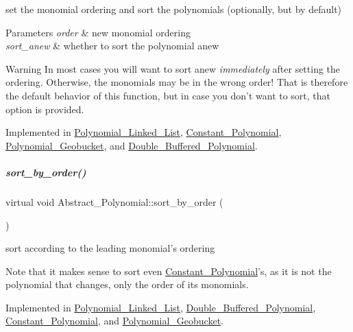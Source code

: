set the monomial ordering and sort the polynomials (optionally, but by default) 


\begin{DoxyParams}{Parameters}
{\em order} & new monomial ordering \\
\hline
{\em sort\+\_\+anew} & whether to sort the polynomial anew \\
\hline
\end{DoxyParams}
\begin{DoxyWarning}{Warning}
In most cases you will want to sort anew {\itshape immediately} after setting the ordering. Otherwise, the monomials may be in the wrong order! That is therefore the default behavior of this function, but in case you don't want to sort, that option is provided. 
\end{DoxyWarning}


Implemented in \hyperlink{group__polygroup_af9b1dee3a8ca9fb26a6e069ea70ea5df}{Polynomial\+\_\+\+Linked\+\_\+\+List}, \hyperlink{group__polygroup_a539835f92490fbbb5ba3b37e4f80ef49}{Constant\+\_\+\+Polynomial}, \hyperlink{group__polygroup_ad3298b3201f53d0ddaa657206c140ca8}{Polynomial\+\_\+\+Geobucket}, and \hyperlink{group__polygroup_aa81be797dcced4e663d3fe54f6501ed6}{Double\+\_\+\+Buffered\+\_\+\+Polynomial}.

\mbox{\label{group__polygroup_a1fcdd29c324c660ea935197c39e682f2}} 
\subparagraph{\texorpdfstring{sort\+\_\+by\+\_\+order()}{sort\_by\_order()}}
{\footnotesize\ttfamily virtual void Abstract\+\_\+\+Polynomial\+::sort\+\_\+by\+\_\+order (\begin{DoxyParamCaption}{ }\end{DoxyParamCaption})\hspace{0.3cm}{\ttfamily [pure virtual]}}



sort according to the leading monomial's ordering 

Note that it makes sense to sort even \hyperlink{group__polygroup_class_constant___polynomial}{Constant\+\_\+\+Polynomial}'s, as it is not the polynomial that changes, only the order of its monomials. 

Implemented in \hyperlink{group__polygroup_a254bec60707b34bd26ef9d9bb08a4fe9}{Polynomial\+\_\+\+Linked\+\_\+\+List}, \hyperlink{group__polygroup_a41e751eee1614e26ebba39a9f81f7993}{Double\+\_\+\+Buffered\+\_\+\+Polynomial}, \hyperlink{group__polygroup_a808018b52eca472a7a1b2995e403f35a}{Constant\+\_\+\+Polynomial}, and \hyperlink{group__polygroup_ad3c705cb5c03be2ed62fea65101d1195}{Polynomial\+\_\+\+Geobucket}.

